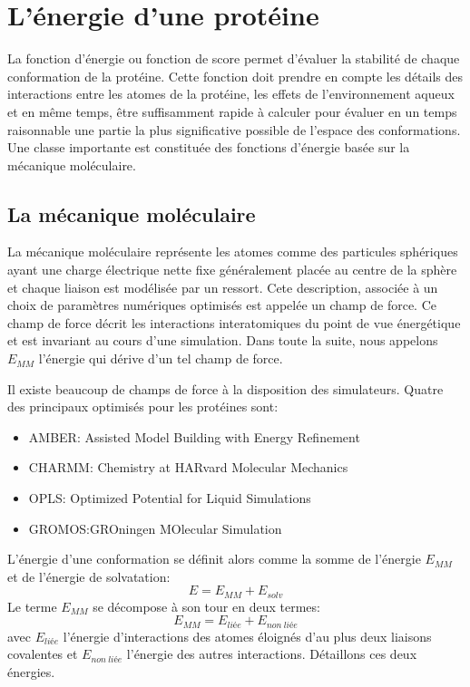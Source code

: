 \section{L'énergie d'une protéine}

La fonction d'énergie ou fonction de score permet d'évaluer la stabilité de chaque conformation de la protéine. Cette fonction doit prendre en compte les détails des interactions entre les atomes de la protéine, les effets de l'environnement aqueux et en même temps, être suffisamment rapide à calculer pour évaluer en un temps raisonnable une partie la plus significative possible de l'espace des conformations. Une classe importante est constituée des fonctions d'énergie basée sur la mécanique moléculaire.

\subsection{La mécanique moléculaire}
\label{sub:mecamol}
La mécanique moléculaire représente les atomes comme des particules sphériques ayant une charge électrique nette fixe généralement placée au centre de la sphère et chaque liaison est modélisée par un ressort. Cete description, associée à un choix de paramètres numériques optimisés est appelée un champ de force. Ce champ de force décrit les interactions interatomiques du point de vue énergétique et est invariant au cours d'une simulation.
Dans toute la suite, nous appelons $E_{MM}$ l'énergie qui dérive d'un tel champ de force.

Il existe beaucoup de champs de force à la disposition des simulateurs. Quatre des principaux optimisés pour les protéines sont:

\begin{itemize}
\item AMBER: Assisted Model Building with Energy Refinement \cite{Cornell95}
\item CHARMM: Chemistry at HARvard Molecular Mechanics \cite{Brooks09}
\item OPLS: Optimized Potential for Liquid Simulations \cite{Jorgensen88}
\item GROMOS:GROningen MOlecular Simulation \cite{Christen05}
\end{itemize}
L'énergie d'une conformation se définit alors comme la somme de l'énergie $E_{MM}$  et de l'énergie de solvatation:
\begin{equation}
  E = E_{MM} + E_{solv}
\end{equation}
Le terme $E_{MM}$ se décompose à son tour en deux termes:
\begin{equation}
  E_{MM} = E_{liée} + E_{non\ liée}
\end{equation}
avec $E_{liée}$ l'énergie d'interactions des atomes éloignés d'au plus deux liaisons covalentes et $E_{non\ liée}$  l'énergie des autres interactions. Détaillons ces deux énergies.

